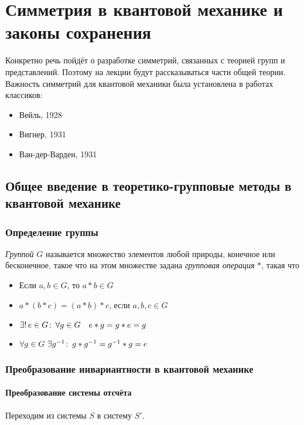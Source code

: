 \chapter{Симметрия в квантовой механике и законы сохранения}
\Rem Конкретно речь пойдёт о разработке симметрий, связанных с теорией групп и представлений.
Поэтому на лекции будут рассказываться части общей теории.
Важность симметрий для квантовой механики была установлена в работах классиков:
\begin{itemize}
  \item Вейль, 1928
  \item Вигнер, 1931
  \item Ван-дер-Варден, 1931
\end{itemize}
\section[Теория групп в квантовой механике]{Общее введение в теоретико-групповые методы в квантовой механике}
\subsection{Определение группы}
\Def \emph{Группой} $G$ называется множество элементов любой природы, конечное или бесконечное, такое что на этом множестве задана \emph{групповая операция} $\ast$, такая что
\begin{itemize}
  \item Если $a, b \in G$, то $a\ast b \in G$
  \item $a \ast (b \ast c) = (a \ast b) \ast c$, если   $a, b, c \in G$
  \item $\exists! \,  e \in G \colon \, \forall g \in G \quad e\ast g = g\ast e = g$
  \item $\forall g \in G \,\, \exists g^{-1} \colon \, g \ast g^{-1} = g^{-1} \ast g = e$
\end{itemize}
\subsection{Преобразование инвариантности в квантовой механике}
\subsubsection{Преобразование системы отсчёта}
Переходим из системы $S$ в систему $S'$.

